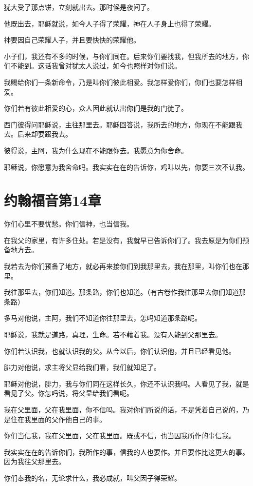 \documentclass[12pt,oneside]{book}
\begin{document}
犹大受了那点饼，立刻就出去。那时候是夜间了。

他既出去，耶稣就说，如今人子得了荣耀，神在人子身上也得了荣耀。

神要因自己荣耀人子，并且要快快的荣耀他。

小子们，我还有不多的时候，与你们同在。后来你们要找我，但我所去的地方，你们不能到。这话我曾对犹太人说过，如今也照样对你们说。

我赐给你们一条新命令，乃是叫你们彼此相爱。我怎样爱你们，你们也要怎样相爱。

你们若有彼此相爱的心，众人因此就认出你们是我的门徒了。

西门彼得问耶稣说，主往那里去。耶稣回答说，我所去的地方，你现在不能跟我去。后来却要跟我去。

彼得说，主阿，我为什么现在不能跟你去。我愿意为你舍命。

耶稣说，你愿意为我舍命吗。我实实在在的告诉你，鸡叫以先，你要三次不认我。

\chapter{约翰福音第14章}
你们心里不要忧愁。你们信神，也当信我。

在我父的家里，有许多住处。若是没有，我就早已告诉你们了。我去原是为你们预备地方去。

我若去为你们预备了地方，就必再来接你们到我那里去，我在那里，叫你们也在那里。

我往那里去，你们知道。那条路，你们也知道。（有古卷作我往那里去你们知道那条路）

多马对他说，主阿，我们不知道你往那里去，怎吗知道那条路呢。

耶稣说，我就是道路，真理，生命。若不藉着我。没有人能到父那里去。

你们若认识我，也就认识我的父。从今以后，你们认识他，并且已经看见他。

腓力对他说，求主将父显给我们看，我们就知足了。

耶稣对他说，腓力，我与你们同在这样长久，你还不认识我吗。人看见了我，就是看见了父。你怎吗说，将父显给我们看呢。

我在父里面，父在我里面，你不信吗。我对你们所说的话，不是凭着自己说的，乃是住在我里面的父作他自己的事。

你们当信我，我在父里面，父在我里面。既或不信，也当因我所作的事信我。

我实实在在的告诉你们，我所作的事，信我的人也要作。并且要作比这更大的事。因为我往父那里去。

你们奉我的名，无论求什么，我必成就，叫父因子得荣耀。
\end{document}
